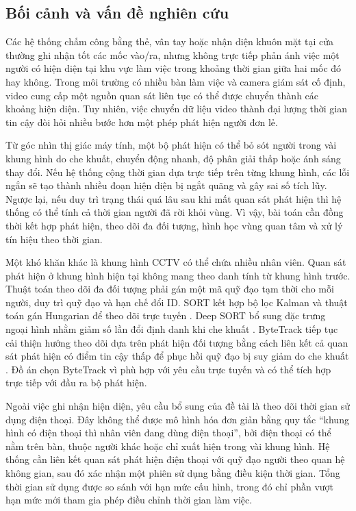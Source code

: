 \setcounter{section}{1}
\setcounter{subsection}{0}
\setcounter{subsubsection}{0}

\subsection{Bối cảnh và vấn đề nghiên cứu}
Các hệ thống chấm công bằng thẻ, vân tay hoặc nhận diện khuôn mặt tại cửa thường ghi nhận tốt các mốc vào/ra, nhưng không trực tiếp phản ánh việc một người có hiện diện tại khu vực làm việc trong khoảng thời gian giữa hai mốc đó hay không. Trong môi trường có nhiều bàn làm việc và camera giám sát cố định, video cung cấp một nguồn quan sát liên tục có thể được chuyển thành các khoảng hiện diện. Tuy nhiên, việc chuyển dữ liệu video thành đại lượng thời gian tin cậy đòi hỏi nhiều bước hơn một phép phát hiện người đơn lẻ.

Từ góc nhìn thị giác máy tính, một bộ phát hiện có thể bỏ sót người trong vài khung hình do che khuất, chuyển động nhanh, độ phân giải thấp hoặc ánh sáng thay đổi. Nếu hệ thống cộng thời gian dựa trực tiếp trên từng khung hình, các lỗi ngắn sẽ tạo thành nhiều đoạn hiện diện bị ngắt quãng và gây sai số tích lũy. Ngược lại, nếu duy trì trạng thái quá lâu sau khi mất quan sát phát hiện thì hệ thống có thể tính cả thời gian người đã rời khỏi vùng. Vì vậy, bài toán cần đồng thời kết hợp phát hiện, theo dõi đa đối tượng, hình học vùng quan tâm và xử lý tín hiệu theo thời gian.

Một khó khăn khác là khung hình CCTV có thể chứa nhiều nhân viên. Quan sát phát hiện ở khung hình hiện tại không mang theo danh tính từ khung hình trước. Thuật toán theo dõi đa đối tượng phải gán một mã quỹ đạo tạm thời cho mỗi người, duy trì quỹ đạo và hạn chế đổi ID. SORT kết hợp bộ lọc Kalman và thuật toán gán Hungarian để theo dõi trực tuyến \cite{sort}. Deep SORT bổ sung đặc trưng ngoại hình nhằm giảm số lần đổi định danh khi che khuất \cite{deepsort}. ByteTrack tiếp tục cải thiện hướng theo dõi dựa trên phát hiện đối tượng bằng cách liên kết cả quan sát phát hiện có điểm tin cậy thấp để phục hồi quỹ đạo bị suy giảm do che khuất \cite{bytetrack}. Đồ án chọn ByteTrack vì phù hợp với yêu cầu trực tuyến và có thể tích hợp trực tiếp với đầu ra bộ phát hiện.

Ngoài việc ghi nhận hiện diện, yêu cầu bổ sung của đề tài là theo dõi thời gian sử dụng điện thoại. Đây không thể được mô hình hóa đơn giản bằng quy tắc ``khung hình có điện thoại thì nhân viên đang dùng điện thoại'', bởi điện thoại có thể nằm trên bàn, thuộc người khác hoặc chỉ xuất hiện trong vài khung hình. Hệ thống cần liên kết quan sát phát hiện điện thoại với quỹ đạo người theo quan hệ không gian, sau đó xác nhận một phiên sử dụng bằng điều kiện thời gian. Tổng thời gian sử dụng được so sánh với hạn mức cấu hình, trong đó chỉ phần vượt hạn mức mới tham gia phép điều chỉnh thời gian làm việc.

